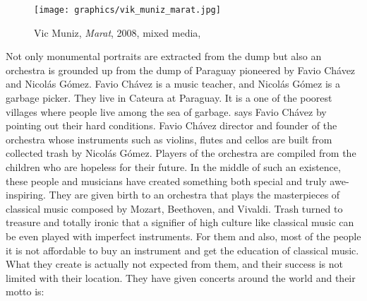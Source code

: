 \begin{figure}[h!]
  \centering
  \texttt{[image: graphics/vik\_muniz\_marat.jpg]}
  \caption{Vic Muniz, \textit{Marat}, 2008, mixed media, }
  \label{fig:VicMuniz_PicturesOfGarbage}
\end{figure}

Not only monumental portraits are extracted from the dump but also an orchestra is grounded up from the dump of Paraguay pioneered by Favio Chávez and Nicolás Gómez. Favio Chávez is a music teacher, and Nicolás Gómez is a garbage picker. They live in Cateura at Paraguay. It is a one of the poorest villages where people live among the sea of garbage.  says Favio Chávez by pointing out their hard conditions. Favio Chávez director and founder of the orchestra whose instruments such as violins, flutes and cellos are built from collected trash by Nicolás Gómez. Players of the orchestra are compiled from the children who are hopeless for their future. In the middle of such an existence, these people and musicians have created something both special and truly awe-inspiring. They are given birth to an orchestra that plays the masterpieces of classical music composed by Mozart, Beethoven, and Vivaldi. Trash turned to treasure and totally ironic that a signifier of high culture like classical music can be even played with imperfect instruments. For them and also, most of the people it is not affordable to buy an instrument and get the education of classical music. What they create is actually not expected from them, and their success is not limited with their location. They have given concerts around the world and their motto is: 

